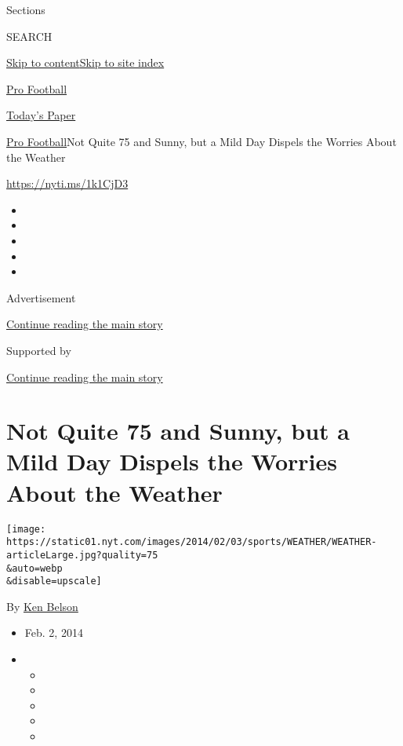 Sections

SEARCH

\protect\hyperlink{site-content}{Skip to
content}\protect\hyperlink{site-index}{Skip to site index}

\href{https://www.nytimes.com/section/sports/football}{Pro Football}

\href{https://myaccount.nytimes.com/auth/login?response_type=cookie\&client_id=vi}{}

\href{https://www.nytimes.com/section/todayspaper}{Today's Paper}

\href{/section/sports/football}{Pro Football}\textbar{}Not Quite 75 and
Sunny, but a Mild Day Dispels the Worries About the Weather

\url{https://nyti.ms/1k1CjD3}

\begin{itemize}
\item
\item
\item
\item
\item
\end{itemize}

Advertisement

\protect\hyperlink{after-top}{Continue reading the main story}

Supported by

\protect\hyperlink{after-sponsor}{Continue reading the main story}

\hypertarget{not-quite-75-and-sunny-but-a-mild-day-dispels-the-worries-about-the-weather}{%
\section{Not Quite 75 and Sunny, but a Mild Day Dispels the Worries
About the
Weather}\label{not-quite-75-and-sunny-but-a-mild-day-dispels-the-worries-about-the-weather}}

\texttt{[image: https://static01.nyt.com/images/2014/02/03/sports/WEATHER/WEATHER-articleLarge.jpg?quality=75\\\&auto=webp\\\&disable=upscale]}

By \href{http://www.nytimes.com/by/ken-belson}{Ken Belson}

\begin{itemize}
\item
  Feb. 2, 2014
\item
  \begin{itemize}
  \item
  \item
  \item
  \item
  \item
  \end{itemize}
\end{itemize}

